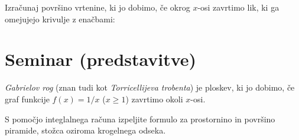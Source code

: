\documentclass[11pt,a4paper]{exam}
\renewcommand{\geq}{\geqslant}
\renewcommand{\{}{\lbrace}
\renewcommand{\}}{\rbrace}
\begin{document}
\begin{questions}
\question Izračunaj površino vrtenine, ki jo dobimo, če okrog $x$-osi zavrtimo lik, ki ga omejujejo krivulje z enačbami:
	
\end{questions}


\section*{Seminar (predstavitve)}
	\begin{questions}
		\question \emph{Gabrielov rog} (znan tudi kot \emph{Torricellijeva trobenta}) je ploskev, ki jo dobimo, če graf funkcije $f(x) = 1/x$ ($x \geq 1$) zavrtimo okoli $x$-osi. 

		\question S pomočjo integlalnega računa izpeljite formulo za prostornino in površino piramide, stožca oziroma krogelnega odseka.
	\end{questions}
\pagestyle{empty}
\clearpage




\pagestyle{head}
\end{document}
